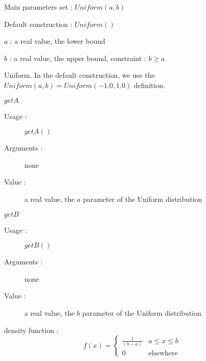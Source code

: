 \begin{description}

\item[Usage :] \rule{0pt}{1em}
  \begin{description}
  \item Main parameters set : $Uniform(a,b)$
  \item Default construction : $Uniform( )$
  \end{description}

\item[Arguments :]  \rule{0pt}{1em}
  \begin{description}
  \item $a$ : a  real value, the lower bound
  \item $b$ : a real value, the upper bound, constraint : $b\geq a$
  \end{description}

\item[Value :]  Uniform. In the default construction, we use the $Uniform(a,b) = Uniform(-1.0, 1.0)$ definition.

\item[Some methods :] \rule{0pt}{1em}
  \begin{description}

  \item $getA$
    \begin{description}
    \item[Usage :] $getA()$
    \item[Arguments :] none
    \item[Value :]  a real value,  the $a$ parameter of the Uniform distribution
    \end{description}
    \bigskip

  \item $getB$
    \begin{description}
    \item[Usage :] $getB()$
    \item[Arguments :] none
    \item[Value :]  a real value,  the $b$ parameter of the Uniform distribution
    \end{description}

  \end{description}

\item[Details :]  \rule{0pt}{1em}
  \begin{description}
  \item density function :
    $$
    f(x) =
    \left\{
      \begin{array}{ll}
        \displaystyle \frac{1}{(b-a)} & a \leq x \leq b \\
        0 & \mbox{elsewhere}
      \end{array}
    \right.
    $$


\end{description}
\end{description}
